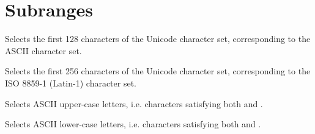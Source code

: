 \section{Subranges}
\begin{haddockdesc}
\item[\begin{tabular}{@{}l}
isAscii :: Char -> Bool
\end{tabular}]
{\haddockbegindoc
Selects the first 128 characters of the Unicode character set,
 corresponding to the ASCII character set.\par}
\end{haddockdesc}
\begin{haddockdesc}
\item[\begin{tabular}{@{}l}
isLatin1 :: Char -> Bool
\end{tabular}]
{\haddockbegindoc
Selects the first 256 characters of the Unicode character set,
 corresponding to the ISO 8859-1 (Latin-1) character set.\par}
\end{haddockdesc}
\begin{haddockdesc}
\item[\begin{tabular}{@{}l}
isAsciiUpper :: Char -> Bool
\end{tabular}]
{\haddockbegindoc
Selects ASCII upper-case letters,
 i.e. characters satisfying both  and .\par}
\end{haddockdesc}
\begin{haddockdesc}
\item[\begin{tabular}{@{}l}
isAsciiLower :: Char -> Bool
\end{tabular}]
{\haddockbegindoc
Selects ASCII lower-case letters,
 i.e. characters satisfying both  and .\par}
\end{haddockdesc}
